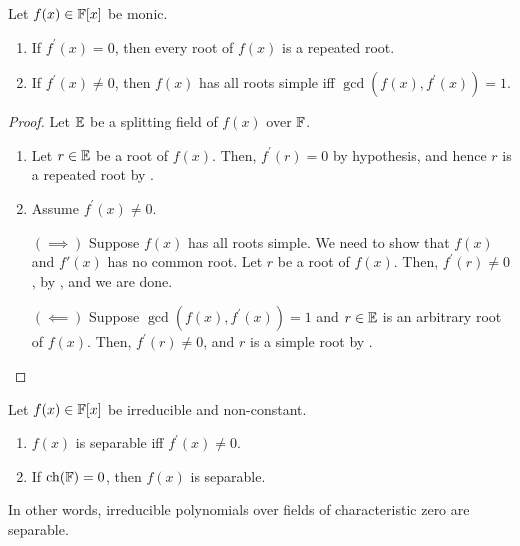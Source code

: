 \begin{theorem} \label{thm:derivative-criterion-separability}
    Let $f(x) \in \mathbb{F}[x]$ be monic.
    \begin{enumerate}
        \item If $f^{\prime}(x) = 0$, then every root of $f(x)$ is a repeated root.
        \item If $f^{\prime}(x) \neq 0$, then $f(x)$ has all roots simple iff $\gcd(f(x), f^{\prime}(x)) = 1$.
    \end{enumerate}
\end{theorem}
\begin{proof}
    Let $\mathbb{E}$ be a splitting field of $f(x)$ over $\mathbb{F}$.
    \begin{enumerate}
        \item Let $r \in \mathbb{E}$ be a root of $f(x)$. Then, $f^{\prime}(r) = 0$ by hypothesis, and hence $r$ is a repeated root by . 
        \item Assume $f^{\prime}(x) \neq 0$.
        
        $(\implies)$ Suppose $f(x)$ has all roots simple. We need to show that $f(x)$ and $f{\prime}(x)$ has no common root. Let $r$ be a root of $f(x)$. Then, $f^{\prime}(r) \neq 0$, by , and we are done.
        
        $(\impliedby)$ Suppose $\gcd(f(x), f^{\prime}(x)) = 1$ and $r \in \mathbb{E}$ is an arbitrary root of $f(x)$. Then, $f^{\prime}(r) \neq 0$, and $r$ is a simple root by . \qedhere
    \end{enumerate}
\end{proof}
\begin{prop} \label{prop:irreducible-separable-zero-char}
    Let $f(x) \in \mathbb{F}[x]$ be irreducible and non-constant.
    \begin{enumerate}
        \item $f(x)$ is separable iff $f^{\prime}(x) \neq 0$.
        \item If $\operatorname{ch}(\mathbb{F}) = 0$, then $f(x)$ is separable.
    \end{enumerate}
    In other words, irreducible polynomials over fields of characteristic zero are separable.
\end{prop}
